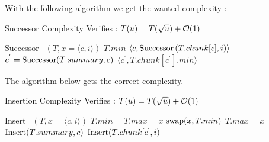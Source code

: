 \documentclass{cours}
\begin{document}
\begin{proposition}
    With the following algorithm we get the wanted complexity : 
    \begin{algorithm}
        \caption{Successor Complexity Verifies : $T(u) = T(\sqrt{u}) + \mathcal{O}(1)$}
        \begin{algorithmic}
            \Function \textmd{Successor}
                \Input $\ \ (T, x = \langle c, i \rangle)$
                \EndInput
                    \State \Return $T.min$
                \EndIf
                    \State \Return $\langle c, \textmd{Successor}\left(T.chunk[c], i\right) \rangle$
                \Else 
                    \State $c^{'} = \textmd{Successor}(T.summary, c)$
                    \State \Return $\langle c^{'}, T.chunk[c^{'}].min\rangle$
                \EndIf
            \EndFunction
        \end{algorithmic}
    \end{algorithm}
\end{proposition}

\begin{proposition}[Insertion]
    The algorithm below gets the correct complexity.
    \begin{algorithm}
        \caption{Insertion Complexity Verifies : $T(u) = T(\sqrt{u}) + \mathcal{O}(1)$}
        \begin{algorithmic}
            \Function \textmd{Insert}
                \Input $\ \ (T, x = \langle c, i \rangle)$
                \EndInput
                    \State $T.min = T.max = x$
                    \State \Return
                \EndIf
                    \State $\textmd{swap}(x, T.min)$
                \EndIf
                    \State $T.max = x$
                \EndIf
                    \State $\textmd{Insert}(T.summary, c)$
                \EndIf
                \State $\textmd{Insert}(T.chunk[c], i)$
            \EndFunction
        \end{algorithmic}
    \end{algorithm}    
\end{proposition}
\end{document}
